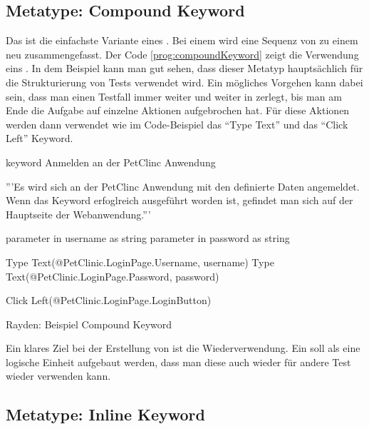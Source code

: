 \subsection{Metatype: Compound Keyword}

Das  ist die einfachste Variante eines . Bei einem  wird eine Sequenz von  zu einem neu  zusammengefasst. Der Code \ref{prog:compoundKeyword} zeigt die Verwendung eins . In dem Beispiel kann man gut sehen, dass dieser Metatyp hauptsächlich für die Strukturierung von Tests verwendet wird. Ein mögliches Vorgehen kann dabei sein, dass man einen Testfall immer weiter und weiter in  zerlegt, bis man am Ende die Aufgabe auf einzelne Aktionen aufgebrochen hat. Für diese Aktionen werden dann  verwendet wie im Code-Beispiel das "`Type Text"' und das "`Click Left"' Keyword.

\begin{program}
\begin{JavaCode}
keyword Anmelden an der PetClinc Anwendung{
	'''Es wird sich an der PetClinc Anwendung mit den definierte Daten 
	   angemeldet. Wenn das Keyword erfoglreich ausgeführt worden ist, 
	   gefindet man sich auf der Hauptseite der Webanwendung.'''
	
	parameter in username as string
	parameter in password as string
	
	Type Text(@PetClinic.LoginPage.Username, username)
	Type Text(@PetClinic.LoginPage.Password, password)
	
	Click Left(@PetClinic.LoginPage.LoginButton)
}
\end{JavaCode}
\caption{Rayden: Beispiel Compound Keyword}
\label{prog:compoundKeyword}
\end{program}

\SuperPar
Ein klares Ziel bei der Erstellung von  ist die Wiederverwendung. Ein  soll als eine logische Einheit aufgebaut werden, dass man diese auch wieder für andere Test wieder verwenden kann. 


\subsection{Metatype: Inline Keyword}

